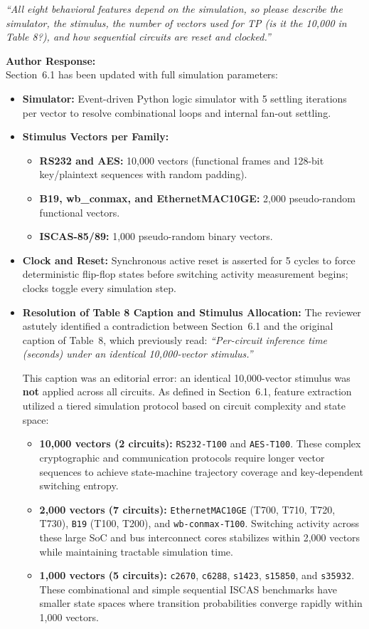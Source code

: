 \documentclass[11pt,a4paper]{article}
\newcommand{\reviewercomment}[1]{\vspace{4pt}\noindent\textcolor{revcomment}{\textit{``#1''}}\vspace{4pt}}
\newcommand{\authorresponse}{\noindent\textbf{Author Response:}}
\begin{document}
\reviewercomment{All eight behavioral features depend on the simulation, so please describe the simulator, the stimulus, the number of vectors used for TP (is it the 10,000 in Table 8?), and how sequential circuits are reset and clocked.}

\authorresponse\\
Section~6.1 has been updated with full simulation parameters:
\begin{itemize}[leftmargin=*]
    \item \textbf{Simulator:} Event-driven Python logic simulator with 5 settling iterations per vector to resolve combinational loops and internal fan-out settling.
    \item \textbf{Stimulus Vectors per Family:}
    \begin{itemize}
        \item \textbf{RS232 and AES:} 10,000 vectors (functional frames and 128-bit key/plaintext sequences with random padding).
        \item \textbf{B19, wb\_conmax, and EthernetMAC10GE:} 2,000 pseudo-random functional vectors.
        \item \textbf{ISCAS-85/89:} 1,000 pseudo-random binary vectors.
    \end{itemize}
    \item \textbf{Clock and Reset:} Synchronous active reset is asserted for 5 cycles to force deterministic flip-flop states before switching activity measurement begins; clocks toggle every simulation step.
    \item \textbf{Resolution of Table 8 Caption and Stimulus Allocation:}
    The reviewer astutely identified a contradiction between Section~6.1 and the original caption of Table~8, which previously read: \textit{``Per-circuit inference time (seconds) under an identical 10,000-vector stimulus.''}
    
    This caption was an editorial error: an identical 10,000-vector stimulus was \textbf{not} applied across all circuits. As defined in Section~6.1, feature extraction utilized a tiered simulation protocol based on circuit complexity and state space:
    \begin{itemize}
        \item \textbf{10,000 vectors (2 circuits):} \texttt{RS232-T100} and \texttt{AES-T100}. These complex cryptographic and communication protocols require longer vector sequences to achieve state-machine trajectory coverage and key-dependent switching entropy.
        \item \textbf{2,000 vectors (7 circuits):} \texttt{EthernetMAC10GE} (T700, T710, T720, T730), \texttt{B19} (T100, T200), and \texttt{wb-conmax-T100}. Switching activity across these large SoC and bus interconnect cores stabilizes within 2,000 vectors while maintaining tractable simulation time.
        \item \textbf{1,000 vectors (5 circuits):} \texttt{c2670}, \texttt{c6288}, \texttt{s1423}, \texttt{s15850}, and \texttt{s35932}. These combinational and simple sequential ISCAS benchmarks have smaller state spaces where transition probabilities converge rapidly within 1,000 vectors.
    \end{itemize}


\end{itemize}
\end{document}
